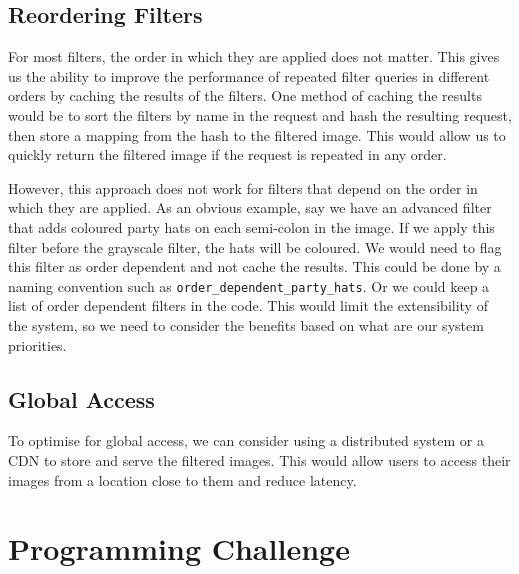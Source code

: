 \documentclass{csse4400}
\begin{document}
\subsection{Reordering Filters}
For most filters, the order in which they are applied does not matter.
This gives us the ability to improve the performance of repeated filter queries in different orders by caching the results of the filters.
One method of caching the results would be to sort the filters by name in the request and hash the resulting request,
then store a mapping from the hash to the filtered image.
This would allow us to quickly return the filtered image if the request is repeated in any order.

However, this approach does not work for filters that depend on the order in which they are applied.
As an obvious example, say we have an advanced filter that adds coloured party hats on each semi-colon in the image.
If we apply this filter before the grayscale filter, the hats will be coloured.
We would need to flag this filter as order dependent and not cache the results.
This could be done by a naming convention such as \texttt{order\_dependent\_party\_hats}.
Or we could keep a list of order dependent filters in the code.
This would limit the extensibility of the system,
so we need to consider the benefits based on what are our system priorities.

\subsection{Global Access}
To optimise for global access,
we can consider using a distributed system or a CDN to store and serve the filtered images.
This would allow users to access their images from a location close to them and reduce latency.


\section{Programming Challenge}
\end{document}
